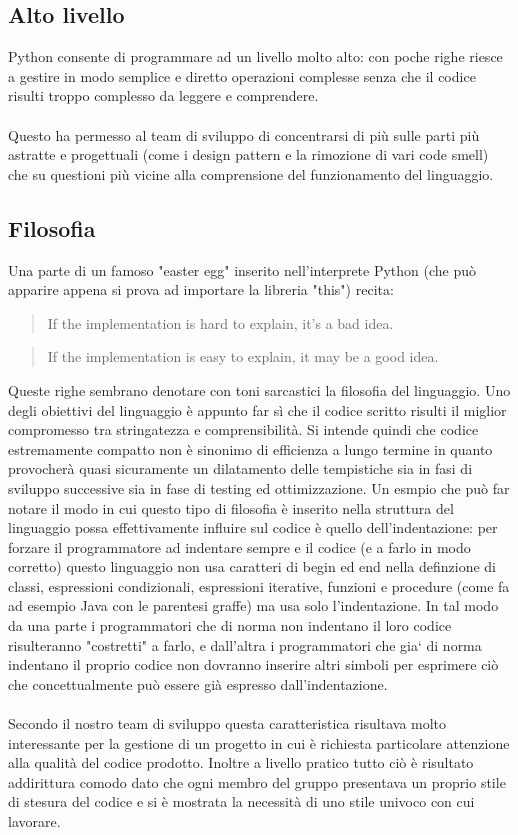 \documentclass[12pt]{scrartcl}
\begin{document}
\subsection{Alto livello}
Python consente di programmare ad un livello molto alto: con poche righe riesce a gestire
in modo semplice e diretto operazioni complesse senza che il codice risulti troppo complesso da leggere e comprendere.
\\ \\
Questo ha permesso al team di sviluppo di concentrarsi di pi\`u sulle parti pi\`u astratte
e progettuali (come i design pattern e la rimozione di vari code smell) che
su questioni pi\`u vicine alla comprensione del funzionamento del linguaggio.
\subsection{Filosofia}
Una parte di un famoso "easter egg" inserito nell'interprete Python (che pu\`o apparire appena si
prova ad importare la libreria "this") recita:
\begin{quotation}
If the implementation is hard to explain, it's a bad idea.
\end{quotation}

\begin{quotation}
If the implementation is easy to explain, it may be a good idea.
\end{quotation}
Queste righe sembrano denotare con toni sarcastici la filosofia del linguaggio.
Uno degli obiettivi del linguaggio \`e appunto far s\`i che il codice scritto
risulti il miglior compromesso tra stringatezza e comprensibilit\`a. Si intende
quindi che codice estremamente compatto non \`e sinonimo di efficienza a lungo termine
in quanto provocher\`a quasi sicuramente un dilatamento delle tempistiche
sia in fasi di sviluppo successive sia in fase di testing ed ottimizzazione.
Un esmpio che pu\`o far notare il modo in cui questo tipo di filosofia \`e inserito
nella struttura del linguaggio possa effettivamente influire sul codice \`e 
quello dell'indentazione: per forzare il programmatore ad indentare sempre
e il codice (e a farlo in modo corretto) questo linguaggio non usa caratteri
di begin ed end nella definzione di classi, espressioni condizionali,
espressioni iterative, funzioni e procedure (come fa ad esempio Java con le
parentesi graffe) ma usa solo l'indentazione. In tal modo da una parte i programmatori
che di norma non indentano il loro codice risulteranno "costretti" a farlo,
e dall'altra i programmatori che gia` di norma indentano il proprio codice
non dovranno inserire altri simboli per esprimere ci\`o che concettualmente
pu\`o essere gi\`a espresso dall'indentazione. \\ \\
Secondo il nostro team di sviluppo questa caratteristica risultava molto
interessante per la gestione di un progetto in cui \`e richiesta
particolare attenzione alla qualit\`a del codice prodotto. Inoltre a livello
pratico tutto ci\`o \`e risultato addirittura comodo dato che ogni membro
del gruppo presentava un proprio stile di stesura del codice e si \`e mostrata la
necessit\`a di uno stile univoco con cui lavorare.
\end{document}
